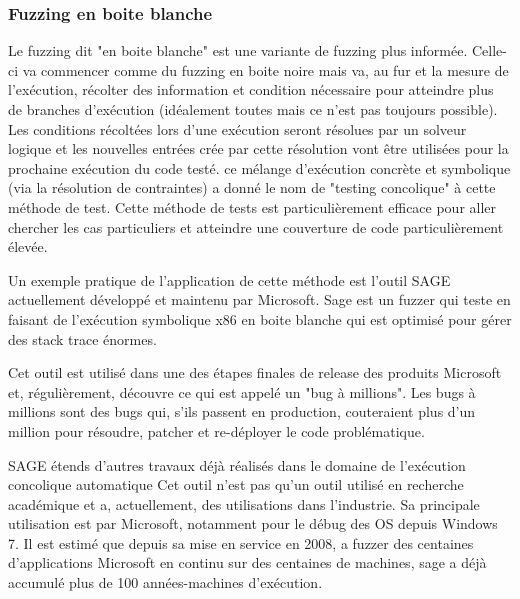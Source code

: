 \documentclass[a4paper]{report}
\begin{document}

\subsubsection{Fuzzing en boite blanche}

Le fuzzing dit "en boite blanche" est une variante de fuzzing plus informée.
Celle-ci va commencer comme du fuzzing en boite noire mais va, au fur et la mesure de l'exécution, récolter des information et condition nécessaire pour atteindre plus de branches d'exécution (idéalement toutes mais ce n'est pas toujours possible).
Les conditions récoltées lors d'une exécution seront résolues par un solveur logique et les nouvelles entrées crée par cette résolution vont être utilisées pour la prochaine exécution du code testé.
ce mélange d'exécution concrète et symbolique (via la résolution de contraintes) a donné le nom de "testing concolique" à cette méthode de test.
Cette méthode de tests est particulièrement efficace pour aller chercher les cas particuliers et atteindre une couverture de code particulièrement élevée.

Un exemple pratique de l'application de cette méthode est l'outil SAGE actuellement développé et maintenu par Microsoft\cite{godefroid2008automated}.
Sage est un fuzzer qui teste en faisant de l'exécution symbolique x86 en boite blanche qui est optimisé pour gérer des stack trace énormes\cite{Godefroid2020}.

Cet outil est utilisé dans une des étapes finales de release des produits Microsoft et, régulièrement, découvre ce  qui est appelé un "bug à millions".
Les bugs à millions sont des bugs qui, s’ils passent en production, couteraient plus d'un million pour résoudre, patcher et re-déployer le code problématique\cite{Godefroid2012}.

SAGE étends d'autres travaux déjà réalisés dans le domaine de l'exécution concolique automatique\cite{Godefroid2020} \cite{cadar2005execution} \cite{godefroid2005dart}
Cet outil n'est pas qu'un outil utilisé en recherche académique et a, actuellement, des utilisations dans l'industrie.
Sa principale utilisation est par Microsoft, notamment pour le débug des OS depuis Windows 7.
Il est estimé que depuis sa mise en service en 2008, a fuzzer des centaines d'applications Microsoft en continu sur des centaines de machines, sage a déjà accumulé plus de 100 années-machines d'exécution\cite{Godefroid2012}.
\end{document}
